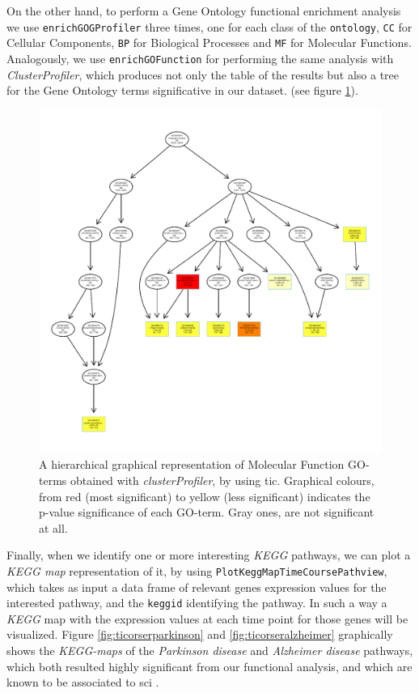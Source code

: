 On the other hand, to perform a Gene Ontology functional enrichment analysis we use \lstinline!enrichGOGProfiler! three times, one for each class of the \lstinline!ontology!, \lstinline!CC! for Cellular Components, \lstinline!BP! for Biological Processes and \lstinline!MF! for Molecular Functions.
Analogously, we use \lstinline!enrichGOFunction! for performing the same analysis with \textit{ClusterProfiler}, which produces not only the table of the results but also a tree for the Gene Ontology terms significative in our dataset. (see figure \ref{fig:ticorsergo}).

\begin{figure}[H]
\centering
\includegraphics[width=\textwidth, keepaspectratio]{img/ticorser/functional/mf_hier.pdf}
\caption[ticorser hierarchial GO-terms]{A hierarchical graphical representation of Molecular Function GO-terms obtained with \textit{clusterProfiler}, by using \gls{tic}.
Graphical colours, from red (most significant) to yellow (less significant) indicates the p-value significance of each GO-term. 
Gray ones, are not significant at all.}
\label{fig:ticorsergo}
\end{figure}

Finally, when we identify one or more interesting \textit{KEGG} pathways, we can plot a \textit{KEGG map} representation of it, by using \lstinline!PlotKeggMapTimeCoursePathview!, which takes as input a data frame of relevant genes expression values for the interested pathway, and the \lstinline!keggid! identifying the pathway. 
In such a way a \textit{KEGG} map with the expression values at each time point for those genes will be visualized.
Figure \ref{fig:ticorserparkinson} and \ref{fig:ticorseralzheimer} graphically shows the \textit{KEGG-maps} of the \textit{Parkinson disease} and \textit{Alzheimer disease} pathways, which both resulted highly significant from our functional analysis, and which are known to be associated to \gls{sci} \cite{Yeh2016, Yeh2018}.

